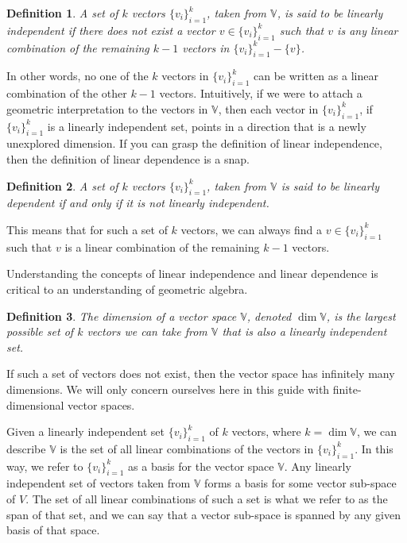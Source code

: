 \documentclass[12pt]{article}
\newcommand{\V}{\mathbb{V}}
\newtheorem{definition}{Definition}[section]
\begin{document}
\begin{definition}
A set of $k$ vectors $\{v_i\}_{i=1}^k$, taken from $\V$, is said to be linearly
independent if there does not exist a vector $v\in\{v_i\}_{i=1}^k$ such that
$v$ is any linear combination of the remaining $k-1$ vectors in $\{v_i\}_{i=1}^k-\{v\}$.
\end{definition}

In other words, no one of the $k$ vectors in $\{v_i\}_{i=1}^k$ can be
written as a linear combination of the other $k-1$ vectors.  Intuitively, if
we were to attach a geometric interpretation to the vectors in $\V$, then
each vector in $\{v_i\}_{i=1}^k$, if $\{v_i\}_{i=1}^k$ is a linearly independent set, points
in a direction that is a newly unexplored dimension.  If you can grasp the
definition of linear independence, then the definition of linear dependence
is a snap.

\begin{definition}
A set of $k$ vectors $\{v_i\}_{i=1}^k$, taken from $\V$ is said to be linearly
dependent if and only if it is not linearly independent.
\end{definition}

This means that for such a set of $k$ vectors, we can always find a $v\in\{v_i\}_{i=1}^k$
such that $v$ is a linear combination of the remaining $k-1$ vectors.

Understanding the concepts of linear independence and linear dependence is
critical to an understanding of geometric algebra.

\begin{definition}
The dimension of a vector space $\V$, denoted $\dim\V$, is the largest
possible set of $k$ vectors we can take from $\V$ that is also a linearly
independent set.
\end{definition}

If such a set of vectors does not exist, then the vector space has
infinitely many dimensions.  We will only concern ourselves here in this
guide with finite-dimensional vector spaces.

Given a linearly independent set $\{v_i\}_{i=1}^k$ of $k$ vectors, where $k=\dim\V$,
we can describe $\V$ is the set of all linear combinations of the vectors in $\{v_i\}_{i=1}^k$.
In this way, we refer to $\{v_i\}_{i=1}^k$ as a basis for the vector space $\V$.
Any linearly independent set of vectors taken from $\V$ forms a basis for some
vector sub-space of $V$.  The set of all linear combinations of such a set is
what we refer to as the span of that set, and we can say that a vector sub-space
is spanned by any given basis of that space.
\end{document}
